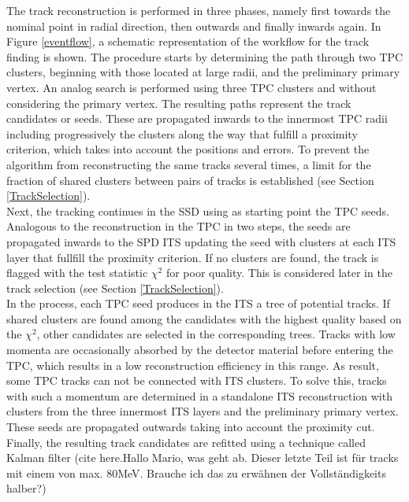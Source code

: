 \documentclass[12pt,a4paper]{report}
\begin{document}
The track reconstruction is performed in three phases, namely first towards the nominal point in radial direction, then outwards and finally inwards again. In Figure \ref{eventflow}, a schematic representation of the workflow for the track finding is shown. The procedure starts by determining the path through two TPC clusters, beginning with those located at large radii, and the preliminary primary vertex. An analog search is performed using three TPC clusters and without considering the primary vertex. The resulting paths represent the track candidates or seeds. These are propagated inwards to the innermost TPC radii including progressively the clusters along the way that fulfill a proximity criterion, which takes into account the positions and errors. To prevent the algorithm from reconstructing the same tracks several times, a limit for the fraction of shared clusters between pairs of tracks is established (see Section \ref{TrackSelection}).\\
Next, the tracking continues in the SSD using as starting point the TPC seeds. Analogous to the reconstruction in the TPC in two steps, the seeds are propagated inwards to the SPD ITS updating the seed with clusters at each ITS layer that fullfill the proximity criterion. If no clusters are found, the track is flagged with the test statistic $\chi^2$ for poor quality. This is considered later in the track selection (see Section \ref{TrackSelection}). \\
In the process, each TPC seed produces in the ITS a tree of potential tracks. If shared clusters are found among the candidates with the highest quality based on the $\chi^2$, other candidates are selected in the corresponding trees. Tracks with low momenta are occasionally absorbed by the detector material before entering the TPC, which results in a low reconstruction efficiency in this range. As result, some TPC tracks can not be connected with ITS clusters. To solve this, tracks with such a momentum are determined in a standalone ITS reconstruction with clusters from the three innermost ITS layers and the preliminary primary vertex. These seeds are propagated outwards taking into account the proximity cut. Finally, the resulting track candidates are refitted using a technique called Kalman filter (cite here.Hallo Mario, was geht ab. Dieser letzte Teil ist für tracks mit einem \pt von max. 80MeV. Brauche ich das zu erwähnen der Vollständigkeits halber?)\\
\end{document}
